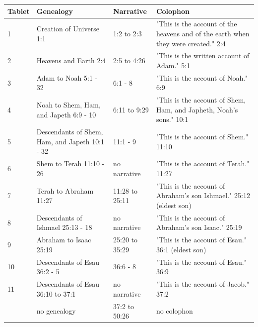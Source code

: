 \documentclass{article}
\begin{document}
\begin{tabular}{llll}
\toprule
Tablet & Genealogy & Narrative & Colophon \\
\midrule
1 & Creation of Universe 1:1 & 1:2 to 2:3 & "This is the account of the heavens and of the earth when they were created." 2:4 \\
2 & Heavens and Earth 2:4 & 2:5 to 4:26 & "This is the written account of Adam." 5:1 \\
3 & Adam to Noah 5:1 - 32 & 6:1 - 8 & "This is the account of Noah." 6:9 \\
4 & Noah to Shem, Ham, and Japeth 6:9 - 10 & 6:11 to 9:29 & "This is the account of Shem, Ham, and Japheth, Noah's sons." 10:1 \\
5 & Descendants of Shem, Ham, and Japeth 10:1 - 32 & 11:1 - 9 & "This is the account of Shem." 11:10 \\
6 & Shem to Terah 11:10 - 26 & no narrative & "This is the account of Terah." 11:27 \\
7 & Terah to Abraham 11:27 & 11:28 to 25:11 & "This is the account of Abraham's son Ishmael." 25:12 (eldest son) \\
8 & Descendants of Ishmael 25:13 - 18 & no narrative & "This is the account of Abraham's son Isaac." 25:19 \\
9 & Abraham to Isaac 25:19 & 25:20 to 35:29 & "This is the account of Esau." 36:1 (eldest son) \\
10 & Descendants of Esau 36:2 - 5 & 36:6 - 8 & "This is the account of Esau." 36:9 \\
11 & Descendants of Esau 36:10 to 37:1 & no narrative & "This is the account of Jacob." 37:2 \\
 & no genealogy & 37:2 to 50:26 & no colophon \\
\bottomrule
\end{tabular}
\end{document}
